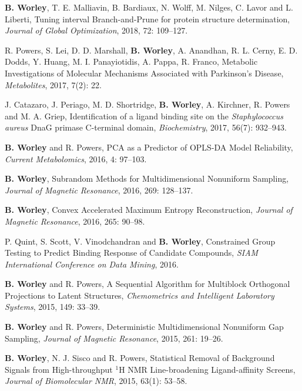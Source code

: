 \documentclass[letterpaper]{article}
\renewenvironment{itemize}{
  \begin{list}{}{
    \setlength{\leftmargin}{1.5em}
  }
}{
  \end{list}
}
\begin{document}
\begin{itemize}
 \item \textbf{B. Worley}, T. E. Malliavin, B. Bardiaux, N. Wolff,
  M. Nilges, C. Lavor and L. Liberti, Tuning interval Branch-and-Prune
  for protein structure determination,
  \emph{Journal of Global Optimization},
  2018, 72: 109--127.

 \item R. Powers, S. Lei, D. D. Marshall, \textbf{B. Worley}, A. Anandhan,
  R. L. Cerny, E. D. Dodds, Y. Huang, M. I. Panayiotidis, A. Pappa,
  R. Franco, Metabolic Investigations of Molecular Mechanisms
  Associated with Parkinson's Disease,
  \emph{Metabolites},
  2017, 7(2): 22.

 \item J. Catazaro, J. Periago, M. D. Shortridge, \textbf{B. Worley},
  A. Kirchner, R. Powers and M. A. Griep,
  Identification of a ligand binding site on the
  \emph{Staphylococcus aureus} DnaG primase C-terminal domain,
  \emph{Biochemistry}, 2017, 56(7): 932--943.

 \item \textbf{B. Worley} and R. Powers,
  PCA as a Predictor of OPLS-DA Model Reliability,
  \emph{Current Metabolomics},
  2016, 4: 97--103.

 \item \textbf{B. Worley},
  Subrandom Methods for Multidimensional Nonuniform Sampling,
  \emph{Journal of Magnetic Resonance},
  2016, 269: 128--137.

 \item \textbf{B. Worley},
  Convex Accelerated Maximum Entropy Reconstruction,
  \emph{Journal of Magnetic Resonance},
  2016, 265: 90--98.

 \item P. Quint, S. Scott, V. Vinodchandran and \textbf{B. Worley},
  Constrained Group Testing to Predict Binding
  Response of Candidate Compounds,
  \emph{SIAM International Conference on Data Mining}, 2016.

 \item \textbf{B. Worley} and R. Powers,
  A Sequential Algorithm for Multiblock Orthogonal Projections
  to Latent Structures,
  \emph{Chemometrics and Intelligent Laboratory Systems},
  2015, 149: 33--39.

 \item \textbf{B. Worley} and R. Powers,
  Deterministic Multidimensional Nonuniform Gap Sampling,
  \emph{Journal of Magnetic Resonance},
  2015, 261: 19--26.

 \item \textbf{B. Worley}, N. J. Sisco and R. Powers,
  Statistical Removal of Background Signals from High-throughput $^1$H NMR
  Line-broadening Ligand-affinity Screens,
  \emph{Journal of Biomolecular NMR},
  2015, 63(1): 53--58.


\end{itemize}
\end{document}
